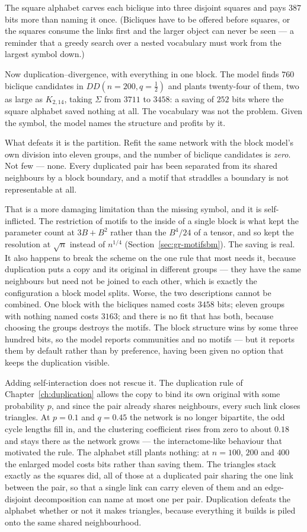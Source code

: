 \noindent The square alphabet carves each biclique into three disjoint squares
and pays $387$ bits more than naming it once. (Bicliques have to be offered
before squares, or the squares consume the links first and the larger object can
never be seen --- a reminder that a greedy search over a nested vocabulary must
work from the largest symbol down.)

Now duplication--divergence, with everything in one block. The model finds $760$
biclique candidates in $DD(n{=}200,q{=}\tfrac12)$ and plants twenty-four of them,
two as large as $K_{2,14}$, taking $\Sigma$ from $3711$ to $3458$: a saving of
$252$ bits where the square alphabet saved nothing at all. The vocabulary was not
the problem. Given the symbol, the model names the structure and profits by it.

What defeats it is the partition. Refit the same network with the block model's
own division into eleven groups, and the number of biclique candidates is
\emph{zero}. Not few --- none. Every duplicated pair has been separated from its
shared neighbours by a block boundary, and a motif that straddles a boundary is
not representable at all.

That is a more damaging limitation than the missing symbol, and it is
self-inflicted. The restriction of motifs to the inside of a single block is what
kept the parameter count at $3B+B^2$ rather than the $B^4/24$ of a tensor, and so
kept the resolution at $\sqrt{n}$ instead of $n^{1/4}$
(Section~\ref{sec:gr-motifsbm}). The saving is real. It also happens to break the
scheme on the one rule that most needs it, because duplication puts a copy and
its original in different groups --- they have the same neighbours but need not
be joined to each other, which is exactly the configuration a block model splits.
Worse, the two descriptions cannot be combined. One block with the bicliques
named costs $3458$ bits; eleven groups with nothing named costs $3163$; and there
is no fit that has both, because choosing the groups destroys the motifs. The
block structure wins by some three hundred bits, so the model reports communities
and no motifs --- but it reports them by default rather than by preference,
having been given no option that keeps the duplication visible.

Adding self-interaction does not rescue it. The duplication rule of
Chapter~\ref{ch:duplication} allows the copy to bind its own original with some
probability $p$, and since the pair already shares neighbours, every such link
closes triangles. At $p=0.1$ and $q=0.45$ the network is no longer bipartite, the
odd cycle lengths fill in, and the clustering coefficient rises from zero to
about $0.18$ and stays there as the network grows --- the interactome-like
behaviour that motivated the rule. The alphabet still plants nothing: at $n=100$,
$200$ and $400$ the enlarged model costs bits rather than saving them. The
triangles stack exactly as the squares did, all of those at a duplicated pair
sharing the one link between the pair, so that a single link can carry eleven of
them and an edge-disjoint decomposition can name at most one per pair.
Duplication defeats the alphabet whether or not it makes triangles, because
everything it builds is piled onto the same shared neighbourhood.

